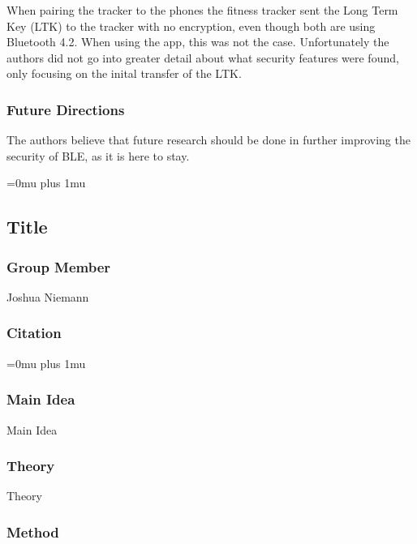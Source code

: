 \noindent
When pairing the tracker to the phones the fitness tracker sent the Long Term Key (LTK) to the tracker with no encryption, even though both are using Bluetooth 4.2. When using the app, this was not the case. Unfortunately the authors did not go into greater detail about what security features were found, only focusing on the inital transfer of the LTK. 

\subsubsection{Future Directions}

\noindent
The authors believe that future research should be done in further improving the security of BLE, as it is here to stay. 

\Urlmuskip=0mu plus 1mu\relax

\noindent
\subsection{Title}

\subsubsection{Group Member}

\noindent
Joshua Niemann

\noindent
\subsubsection{Citation}

\Urlmuskip=0mu plus 1mu\relax

\subsubsection{Main Idea}

\noindent
Main Idea

\subsubsection{Theory}

\noindent
Theory

\subsubsection{Method}

